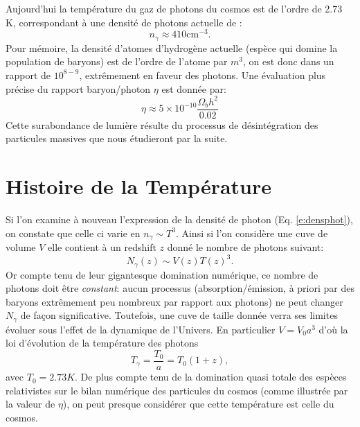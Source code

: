 Aujourd'hui la température du gaz de photons du cosmos est de l'ordre de 2.73 K, correspondant à une densité de photons actuelle de :
\begin{equation}
n_\gamma\approx 410 \mathrm{cm}^{-3}.
\end{equation}
Pour mémoire, la densité d'atomes d'hydrogène actuelle (espèce qui domine la population de baryons) est de l'ordre de l'atome par $m^3$, on est donc dans un rapport de $10^{8-9}$,  extrêmement en faveur des photons. Une évaluation plus précise du rapport baryon/photon $\eta$ est donnée par:
\begin{equation}
\eta \approx 5\times 10^{-10}\frac{\Omega_b h^2}{0.02}
\end{equation}
Cette surabondance de lumière résulte du processus de désintégration des particules massives que nous étudieront par la suite. 

\section{Histoire de la Température}

Si l'on examine à nouveau l'expression de la densité de photon (Eq. \ref{e:densphot}), on constate que celle ci varie en $n_\gamma \sim T^3$. Ainsi si l'on considère une cuve de volume $V$ elle contient à un redshift $z$ donné le nombre de photons suivant:
\begin{equation}
N_\gamma(z) \sim V(z) T(z)^3.
\end{equation}
Or compte tenu de leur gigantesque domination numérique, ce nombre de photons doit être \textit{constant}: aucun processus (absorption/émission, à priori par des baryons extrêmement peu nombreux par rapport aux photons) ne peut changer $N_\gamma$ de façon significative. Toutefois, une cuve de taille donnée verra ses limites évoluer sous l'effet de la dynamique de l'Univers. En particulier $V=V_0 a^3$ d'où la loi d'évolution de la température des photons
\begin{equation}
T_\gamma=\frac{T_0}{a}=T_0 (1+z),
\end{equation}
avec $T_0=2.73K$. De plus compte tenu de la domination quasi totale des espèces relativistes sur le bilan numérique des particules du cosmos (comme illustrée par la valeur de $\eta$), on peut presque considérer que cette température est celle du cosmos. 

